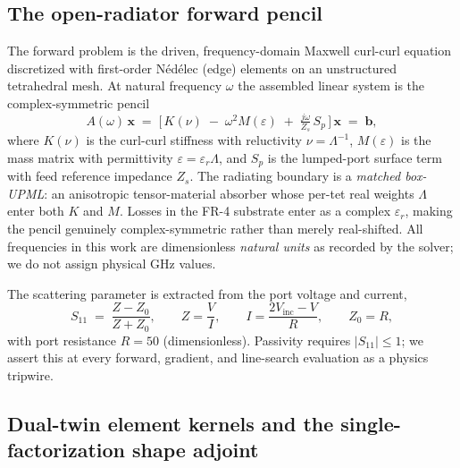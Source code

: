 \documentclass{anvil-paper}
\begin{document}
\subsection{The open-radiator forward pencil}
\label{sec:pencil}

The forward problem is the driven, frequency-domain Maxwell curl-curl equation
discretized with first-order N\'ed\'elec (edge) elements on an unstructured
tetrahedral mesh. At natural frequency $\omega$ the assembled linear system is
the complex-symmetric pencil
\begin{equation}
  A(\omega)\,\mathbf{x} \;=\; \Big[\,K(\nu)\;-\;\omega^2 M(\varepsilon)\;+\;\tfrac{j\omega}{Z_s}\,S_p\,\Big]\,\mathbf{x}
  \;=\; \mathbf{b},
  \label{eq:pencil}
\end{equation}
where $K(\nu)$ is the curl-curl stiffness with reluctivity $\nu=\Lambda^{-1}$,
$M(\varepsilon)$ is the mass matrix with permittivity $\varepsilon=\varepsilon_r\Lambda$,
and $S_p$ is the lumped-port surface term with feed reference impedance
$Z_s$. The radiating boundary is a \emph{matched box-UPML}: an anisotropic
tensor-material absorber whose per-tet real weights $\Lambda$ enter both $K$ and
$M$. Losses in the FR-4 substrate enter as a complex $\varepsilon_r$, making the
pencil genuinely complex-symmetric rather than merely real-shifted. All
frequencies in this work are dimensionless \emph{natural units} as recorded by
the solver; we do not assign physical GHz values.

The scattering parameter is extracted from the port voltage and current,
\begin{equation}
  S_{11} \;=\; \frac{Z-Z_0}{Z+Z_0}, \qquad Z=\frac{V}{I}, \qquad
  I=\frac{2V_{\text{inc}}-V}{R}, \qquad Z_0=R,
  \label{eq:s11}
\end{equation}
with port resistance $R=50$ (dimensionless). Passivity requires
$|S_{11}|\le 1$; we assert this at every forward, gradient, and line-search
evaluation as a physics tripwire.

\subsection{Dual-twin element kernels and the single-factorization shape adjoint}
\label{sec:adjoint}
\end{document}

